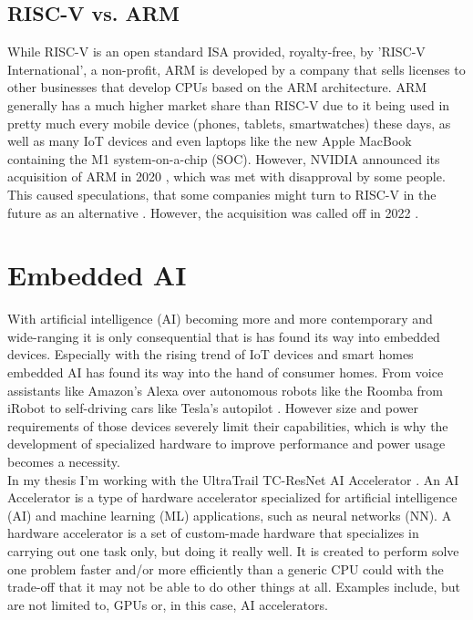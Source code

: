 \subsection{RISC-V vs. ARM}

While RISC-V \cite{riscv} is an open standard ISA provided, royalty-free, by 'RISC-V International', a non-profit,
ARM \cite{arm} is developed by a company that sells licenses to other businesses that develop CPUs based on the ARM architecture.
ARM generally has a much higher market share than RISC-V due to it being used in pretty much every mobile device (phones, tablets, smartwatches)
these days, as well as many IoT devices and even laptops like the new Apple MacBook containing the M1 system-on-a-chip (SOC).
However, NVIDIA announced its acquisition of ARM in 2020 \cite{arm_sale}, which was met with disapproval by some people.
This caused speculations, that some companies might turn to RISC-V in the future as an alternative \cite{arm_sale_speculation}.
However, the acquisition was called off in 2022 \cite{arm_sale_called_off}.


\section{Embedded AI}

With artificial intelligence (AI) becoming more and more contemporary and wide-ranging it is only consequential that is has found its way into embedded devices.
Especially with the rising trend of IoT devices and smart homes embedded AI has found its way into the hand of consumer homes.
From voice assistants like Amazon's Alexa \cite{alexa} over autonomous robots like the Roomba \cite{roomba} from iRobot to self-driving cars like Tesla's autopilot \cite{autopilot}.
However size and power requirements of those devices severely limit their capabilities, which is why the development of specialized hardware to improve performance
and power usage becomes a necessity.\\

In my thesis I'm working with the UltraTrail TC-ResNet AI Accelerator \cite{ultratrail}.
An AI Accelerator is a type of hardware accelerator specialized for artificial intelligence (AI) and machine learning (ML) applications, such as neural networks (NN).
A hardware accelerator is a set of custom-made hardware that specializes in carrying out one task only, but doing it really well.
It is created to perform solve one problem faster and/or more efficiently than a generic CPU could with the trade-off that it may not be able to do other things at all.
Examples include, but are not limited to, GPUs or, in this case, AI accelerators.\\\\


